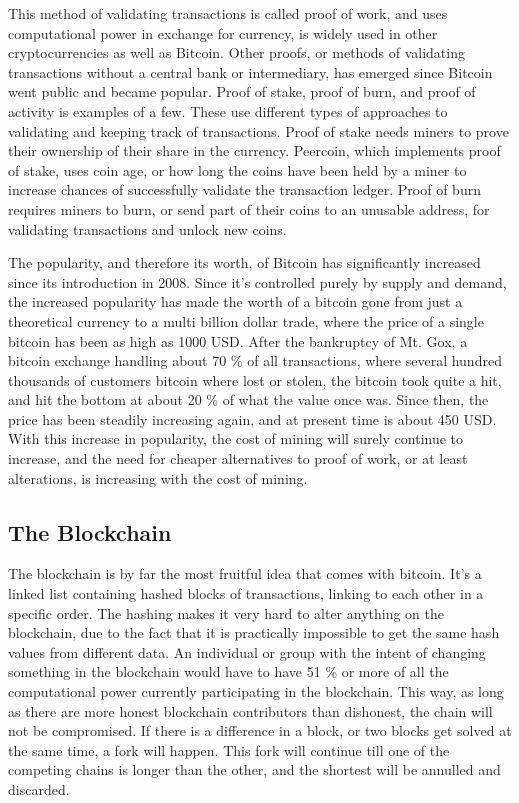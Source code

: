 \documentclass[11pt]{article}
\begin{document}
This method of validating transactions is called proof of work, and uses computational power in exchange for currency, is widely used in other cryptocurrencies as well as Bitcoin. Other proofs, or methods of validating transactions without a central bank or intermediary, has emerged since Bitcoin went public and became popular. Proof of stake, proof of burn, and proof of activity is examples of a few. These use different  types of approaches to validating and keeping track of transactions. Proof of stake needs miners to prove their ownership of their share in the currency. Peercoin, which implements proof of stake, uses coin age, or how long the coins have been held by a miner to increase chances of successfully validate the transaction ledger. Proof of burn requires miners to burn, or send part of their coins to an unusable address, for validating transactions and unlock new coins. 

The popularity, and therefore its worth, of Bitcoin has significantly increased since its introduction in 2008. Since it's controlled purely by supply and demand, the increased popularity has made the worth of a bitcoin gone from just a theoretical currency to a multi billion dollar trade, where the price of a single bitcoin has been as high as 1000 USD. After the bankruptcy of Mt. Gox, a bitcoin exchange handling about 70 \% of all transactions, where several hundred thousands of customers bitcoin where lost or stolen, the bitcoin took quite a hit, and hit the bottom at about 20 \% of what the value once was. Since then, the price has been steadily increasing again, and at present time is about 450 USD. With this increase in popularity, the cost of mining will surely continue to increase, and the need for cheaper alternatives to proof of work, or at least alterations, is increasing with the cost of mining.  

\subsection{The Blockchain}
The blockchain is by far the most fruitful idea that comes with bitcoin. It's a linked list containing hashed blocks of transactions, linking to each other in a specific order. The hashing makes it very hard to alter anything on the blockchain, due to the fact that it is practically impossible to get the same hash values from different data. An individual or group with the intent of changing something in the blockchain would have to have 51 \% or more of all the computational power currently participating in the blockchain. This way, as long as there are more honest blockchain contributors than dishonest, the chain will not be compromised. If there is a difference in a block, or two blocks get solved at the same time, a fork will happen. This fork will continue till one of the competing chains is longer than the other, and the shortest will be annulled and discarded. 
\end{document}
